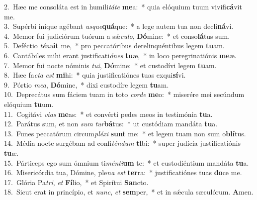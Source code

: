{2.~}Hæc me consoláta est in humili\textit{tá}\textit{te} \textbf{me}a:~* quia elóquium tuum vivifi\textbf{cá}vit me.\\
{3.~}Supérbi iníque agébant \textit{us}\textit{que}\textbf{quá}que:~* a lege autem tua non decli\textbf{ná}vi.\\
{4.~}Memor fui judiciórum tuórum a sǽ\textit{cu}\textit{lo}, \textbf{Dó}mine:~* et conso\textbf{lá}tus sum.\\
{5.~}Deféctio \textit{té}\textit{nu}\textbf{it} me,~* pro peccatóribus derelinquéntibus legem \textbf{tu}am.\\
{6.~}Cantábiles mihi erant justificati\textit{ó}\textit{nes} \textbf{tu}æ,~* in loco peregrinatiónis \textbf{me}æ.\\
{7.~}Memor fui nocte nóminis \textit{tu}\textit{i}, \textbf{Dó}mine:~* et custodívi legem \textbf{tu}am.\\
{8.~}Hæc fa\textit{cta} \textit{est} \textbf{mi}hi:~* quia justificatiónes tuas exqui\textbf{sí}vi.\\
{9.~}Pórtio \textit{me}\textit{a}, \textbf{Dó}mine,~* dixi custodíre legem \textbf{tu}am.\\
{10.~}Deprecátus sum fáciem tuam in toto \textit{cor}\textit{de} \textbf{me}o:~* miserére mei secúndum elóquium \textbf{tu}um.\\
{11.~}Cogitávi \textit{vi}\textit{as} \textbf{me}as:~* et convérti pedes meos in testimónia \textbf{tu}a.\\
{12.~}Parátus sum, et non \textit{sum} \textit{tur}\textbf{bá}tus:~* ut custódiam mandáta \textbf{tu}a.\\
{13.~}Funes peccatórum circum\textit{plé}\textit{xi} \textbf{sunt} me:~* et legem tuam non sum o\textbf{blí}tus.\\
{14.~}Média nocte surgébam ad confi\textit{tén}\textit{dum} \textbf{ti}bi:~* super judícia justificatiónis \textbf{tu}æ.\\
{15.~}Párticeps ego sum ómnium ti\textit{mén}\textit{ti}\textbf{um} te:~* et custodiéntium mandáta \textbf{tu}a.\\
{16.~}Misericórdia tua, Dómine, ple\textit{na} \textit{est} \textbf{ter}ra:~* justificatiónes tuas \textbf{do}ce me.\\
{17.~}Glória Pa\textit{tri}, \textit{et} \textbf{Fí}lio,~* et Spirítui \textbf{San}cto.\\
{18.~}Sicut erat in princípio, et \textit{nunc}, \textit{et} \textbf{sem}per,~* et in sǽcula sæculórum. \textbf{A}men.\\
